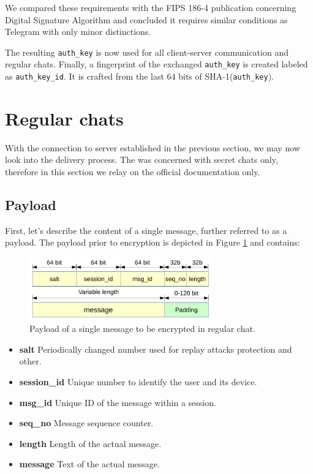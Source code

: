 \documentclass[thesis=M,english]{FITthesis}[2012/10/20]
\begin{document}
We compared these requirements with the FIPS 186-4 publication concerning Digital Signature Algorithm and concluded it requires similar conditions as Telegram with only minor distinctions.

The resulting \texttt{auth\_key} is now used for all client-server communication and regular chats. Finally, a fingerprint of the exchanged \texttt{auth\_key} is created labeled as \texttt{auth\_key\_id}. It is crafted from the last 64 bits of SHA-1(\texttt{auth\_key}).



\section{Regular chats}\label{crypto-regular}

With the connection to server established in the previous section, we may now look into the delivery process. The \cite{telegram-aarhus} was concerned with secret chats only, therefore in this section we relay on the official documentation only.


\subsection{Payload}\label{crypto-regular-payload}

First, let's describe the content of a single message, further referred to as a payload. The payload prior to encryption is depicted in Figure \ref{img:regular-payload} and contains:

\begin{figure}[htb]
	\centering
	\includegraphics[width=0.7\textwidth]{regular-payload.pdf}
	\caption{Payload of a single message to be encrypted in regular chat.}
	\label{img:regular-payload}
\end{figure}

\begin{itemize}
	\item \textbf{salt} Periodically changed number used for replay attacks protection and other.
	\item \textbf{session\_id} Unique number to identify the user and its device.
	\item \textbf{msg\_id} Unique ID of the message within a session.
	\item \textbf{seq\_no} Message sequence counter.
	\item \textbf{length} Length of the actual message.
	\item \textbf{message} Text of the actual message.
\end{itemize}
\end{document}
